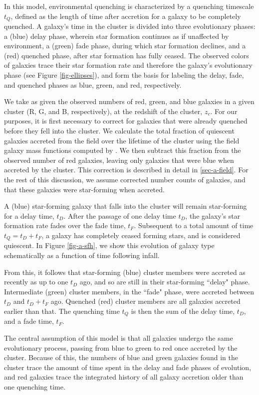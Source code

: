 In this model, environmental quenching is characterized by a quenching timescale $t_Q$, defined as the length of time after accretion for a galaxy to be completely quenched.
A galaxy's time in the cluster is divided into three evolutionary phases: a (blue) delay phase, wherein star formation continues as if unaffected by environment, a (green) fade phase, during which star formation declines, and a (red) quenched phase, after star formation has fully ceased.
The observed colors of galaxies trace their star formation rate and therefore the galaxy's evolutionary phase (see Figure \ref{fig-ellipses}), and form the basis for labeling the delay, fade, and quenched phases as blue, green, and red, respectively.

We take as given the observed numbers of red, green, and blue galaxies in a given cluster (R, G, and B, respectively), at the redshift of the cluster, $z_c$.
For our purposes, it is first necessary to correct for galaxies that were already quenched before they fell into the cluster.
We calculate the total fraction of quiescent galaxies accreted from the field over the lifetime of the cluster using the field galaxy mass functions computed by \citet{Muzzin:2013ab}.
We then subtract this fraction from the observed number of red galaxies, leaving only galaxies that were blue when accreted by the cluster.
This correction is described in detail in \ref{sec-a-field}.
For the rest of this discussion, we assume corrected number counts of galaxies, and that these galaxies were star-forming when accreted.

A (blue) star-forming galaxy that falls into the cluster will remain star-forming for a delay time, $t_D$.
After the passage of one delay time $t_D$, the galaxy's star formation rate fades over the fade time, $t_F$.
Subsequent to a total amount of time $t_Q = t_D + t_F$, a galaxy has completely ceased forming stars, and is considered quiescent.
In Figure \ref{fig-a-sfh}, we show this evolution of galaxy type schematically as a function of time following infall.

From this, it follows that star-forming (blue) cluster members were accreted as recently as up to one $t_D$ ago, and so are still in their star-forming ``delay" phase.
Intermediate (green) cluster members, in the ``fade" phase, were accreted between $t_D$ and $t_D + t_F$ ago.
Quenched (red) cluster members are all galaxies accreted earlier than that.
The quenching time $t_Q$ is then the sum of the delay time, $t_D$, and a fade time, $t_F$.

The central assumption of this model is that all galaxies undergo the same evolutionary process, passing from blue to green to red once accreted by the cluster.
Because of this, the numbers of blue and green galaxies found in the cluster trace the amount of time spent in the delay and fade phases of evolution, and red galaxies trace the integrated history of all galaxy accretion older than one quenching time.

